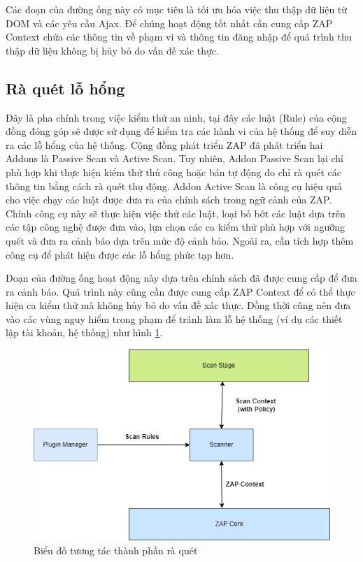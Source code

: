 \documentclass[./../main.tex]{subfiles}
\begin{document}
Các đoạn của đường ống này có mục tiêu là tối ưu hóa việc thu thập dữ liệu từ
DOM và các yêu cầu Ajax. Để chúng hoạt động tốt nhất cần cung cấp
ZAP Context chứa các thông tin về phạm vi và thông tin đăng nhập để quá
trình thu thập dữ liệu không bị hủy bỏ do vấn đề xác thực.

\subsection{Rà quét lỗ hổng}

Đây là pha chính trong việc kiểm thử an ninh, tại đây các luật (Rule)
của cộng đồng đóng góp sẽ được sử dụng để kiểm tra các hành vi của hệ
thống để suy diễn ra các lỗ hổng của hệ thống. Cộng đồng phát triển ZAP
đã phát triển hai Addons là Passive Scan và Active Scan. Tuy nhiên,
Addon Passive Scan lại chỉ phù hợp khi thực hiện kiểm thử thủ công hoặc bán
tự động do chỉ rà quét các thông tin bằng cách rà quét thụ động. Addon Active Scan
là công cụ hiệu quả cho việc chạy các luật được đưa ra của chính sách trong
ngữ cảnh của ZAP. Chính công cụ này sẽ thực hiện việc thử các luật, loại bỏ
bớt các luật dựa trên các tập công nghệ được đưa vào, lựa chọn các ca kiểm
thử phù hợp với ngưỡng quét và đưa ra cảnh báo dựa trên mức độ cảnh bảo. Ngoài ra,
cần tích hợp thêm công cụ để phát hiện được các lỗ hổng phức tạp hơn.

Đoạn của đường ống hoạt động này dựa trên chính sách đã được cung cấp để đưa ra
cảnh báo. Quá trình này cũng cần được cung cấp ZAP Context để có thể thực
hiện ca kiểm thử mà không hủy bỏ do vấn đề xác thực. Đồng thời cũng nên đưa
vào các vùng nguy hiểm trong phạm để tránh làm lỗ hệ thống (ví dụ các
thiết lập tài khoản, hệ thống) như hình \ref{fig:scan_stage}.

\begin{figure}[ht!]
	\includegraphics[width=\linewidth]{./images/scan_stage.png}
	\caption{Biểu đồ tương tác thành phần rà quét}
	\label{fig:scan_stage}
\end{figure}
\end{document}
